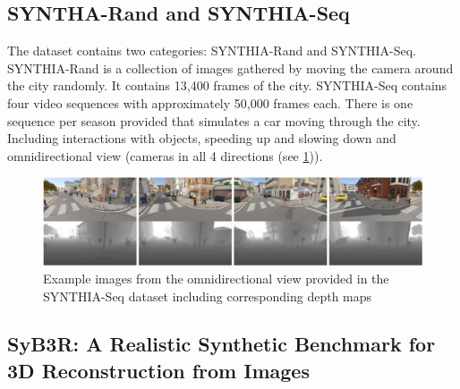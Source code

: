 \documentclass[a4paper,cleardoubleempty,BCOR1cm]{scrbook}
\begin{document}
\subsection{SYNTHA-Rand and SYNTHIA-Seq}
The dataset contains two categories: SYNTHIA-Rand and SYNTHIA-Seq. SYNTHIA-Rand is a collection of images gathered by moving the camera around the city randomly. It contains 13,400 frames of the city. SYNTHIA-Seq contains four video sequences with approximately 50,000 frames each. There is one sequence per season provided that simulates a car moving through the city. Including interactions with objects, speeding up and slowing down and omnidirectional view (cameras in all 4 directions (see \ref{SYNTHIA_depth})). 

\begin{figure}[h]
	\centering
	\includegraphics[width=\textwidth]{images/SYNTHIA_depth.png}
	\caption{Example images from the omnidirectional view provided in the SYNTHIA-Seq dataset including corresponding depth maps}
	\label{SYNTHIA_depth}
\end{figure}


\newpage

\subsection{SyB3R: A Realistic Synthetic Benchmark for 3D Reconstruction from Images}
\cite{syb3r2016}\\
\end{document}
